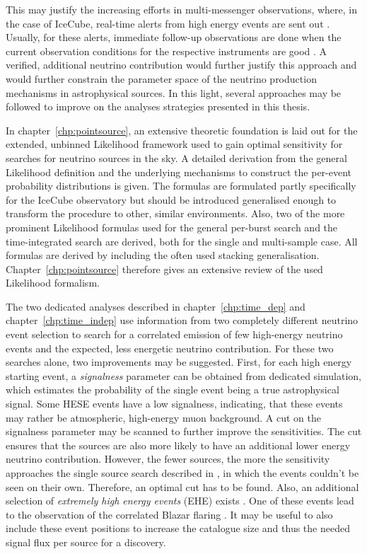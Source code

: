 This may justify the increasing efforts in multi-messenger observations, where, in the case of IceCube, real-time alerts from high energy events are sent out \cite{Aartsen:2016lmt}.
Usually, for these alerts, immediate follow-up observations are done when the current observation conditions for the respective instruments are good \cite{DeLotto:2017ggz}.
A verified, additional neutrino contribution would further justify this approach and would further constrain the parameter space of the neutrino production mechanisms in astrophysical sources.
In this light, several approaches may be followed to improve on the analyses strategies presented in this thesis.

In chapter~\ref{chp:pointsource}, an extensive theoretic foundation is laid out for the extended, unbinned Likelihood framework used to gain optimal sensitivity for searches for neutrino sources in the sky.
A detailed derivation from the general Likelihood definition and the underlying mechanisms to construct the per-event probability distributions is given.
The formulas are formulated partly specifically for the IceCube observatory but should be introduced generalised enough to transform the procedure to other, similar environments.
Also, two of the more prominent Likelihood formulas used for the general per-burst search and the time-integrated search are derived, both for the single and multi-sample case.
All formulas are derived by including the often used stacking generalisation.
Chapter~\ref{chp:pointsource} therefore gives an extensive review of the used Likelihood formalism.

The two dedicated analyses described in chapter~\ref{chp:time_dep} and chapter~\ref{chp:time_indep} use information from two completely different neutrino event selection to search for a correlated emission of few high-energy neutrino events and the expected, less energetic neutrino contribution.
For these two searches alone, two improvements may be suggested.
First, for each high energy starting event, a \emph{signalness} parameter can be obtained from dedicated simulation, which estimates the probability of the single event being a true astrophysical signal.
Some HESE events have a low signalness, indicating, that these events may rather be atmospheric, high-energy muon background.
A cut on the signalness parameter may be scanned to further improve the sensitivities.
The cut ensures that the sources are also more likely to have an additional lower energy neutrino contribution.
However, the fewer sources, the more the sensitivity approaches the single source search described in \cite{Aartsen:2016oji}, in which the events couldn't be seen on their own.
Therefore, an optimal cut has to be found.
Also, an additional selection of \emph{extremely high energy events} (EHE) exists \cite{Yoshida:2017ghs,Aartsen:2016ngq}.
One of these events lead to the observation of the correlated Blazar flaring \cite{IceCube:2018cha}.
It may be useful to also include these event positions to increase the catalogue size and thus the needed signal flux per source for a discovery.

